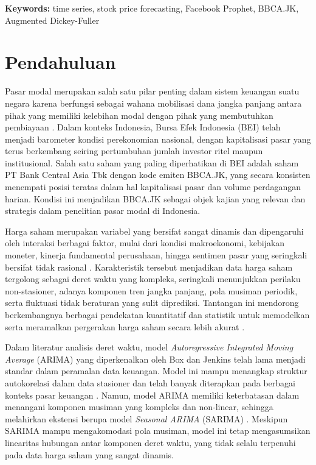 \documentclass[11pt,twoside]{article}
\newcommand{\SMDSKeywords}[1]{
\vspace{0.5em}
\noindent\textbf{Keywords:} #1
}
\begin{document}
\begin{abstract}
\end{abstract}

\SMDSKeywords{time series, stock price forecasting, Facebook Prophet, BBCA.JK, Augmented Dickey-Fuller}

\section{Pendahuluan}
\label{Sec:Intro}

Pasar modal merupakan salah satu pilar penting dalam sistem keuangan suatu negara karena
berfungsi sebagai wahana mobilisasi dana jangka panjang antara pihak yang memiliki kelebihan modal
dengan pihak yang membutuhkan pembiayaan \cite{Tandelilin2010}. Dalam konteks Indonesia, Bursa Efek Indonesia
(BEI) telah menjadi barometer kondisi perekonomian nasional, dengan kapitalisasi pasar yang terus
berkembang seiring pertumbuhan jumlah investor ritel maupun institusional. Salah satu saham yang
paling diperhatikan di BEI adalah saham PT Bank Central Asia Tbk dengan kode emiten BBCA.JK,
yang secara konsisten menempati posisi teratas dalam hal kapitalisasi pasar dan volume perdagangan
harian. Kondisi ini menjadikan BBCA.JK sebagai objek kajian yang relevan dan strategis dalam
penelitian pasar modal di Indonesia.

Harga saham merupakan variabel yang bersifat sangat dinamis dan dipengaruhi oleh interaksi
berbagai faktor, mulai dari kondisi makroekonomi, kebijakan moneter, kinerja fundamental
perusahaan, hingga sentimen pasar yang seringkali bersifat tidak rasional \cite{Fama1970}. Karakteristik
tersebut menjadikan data harga saham tergolong sebagai deret waktu yang kompleks, seringkali
menunjukkan perilaku non-stasioner, adanya komponen tren jangka panjang, pola musiman
periodik, serta fluktuasi tidak beraturan yang sulit diprediksi. Tantangan ini mendorong
berkembangnya berbagai pendekatan kuantitatif dan statistik untuk memodelkan serta meramalkan
pergerakan harga saham secara lebih akurat \cite{Box2015}.

Dalam literatur analisis deret waktu, model \textit{Autoregressive Integrated Moving Average}
(ARIMA) yang diperkenalkan oleh Box dan Jenkins \cite{Box2015} telah lama menjadi standar dalam
peramalan data keuangan. Model ini mampu menangkap struktur autokorelasi dalam data stasioner
dan telah banyak diterapkan pada berbagai konteks pasar keuangan \cite{Mondal2014}. Namun, model ARIMA
memiliki keterbatasan dalam menangani komponen musiman yang kompleks dan non-linear, sehingga
melahirkan ekstensi berupa model \textit{Seasonal ARIMA} (SARIMA) \cite{Hyndman2018}. Meskipun SARIMA
mampu mengakomodasi pola musiman, model ini tetap mengasumsikan linearitas hubungan antar
komponen deret waktu, yang tidak selalu terpenuhi pada data harga saham yang sangat dinamis.
\end{document}
